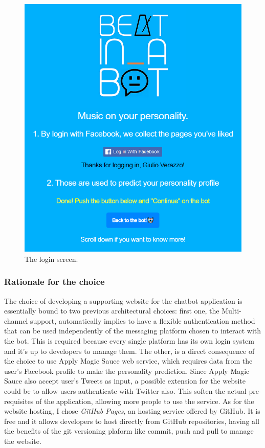 \documentclass[b5paper,10pt,twoside,cucitura]{toptesi}
\begin{document}
\begin{figure}[ht]
\centering
\includegraphics[scale=0.65]{website1.png}
\caption{The login screen.}
\end{figure}


\subsubsection{Rationale for the choice}
The choice of developing a supporting website for the chatbot application is essentially bound to two previous architectural choices: first one, the Multi-channel support, automatically implies to have a flexible authentication method that can be used independently of the messaging platform chosen to interact with the bot. This is required because every single platform has its own login system and it's up to developers to manage them. The other, is a direct consequence of the choice to use Apply Magic Sauce web service, which requires data from the user's Facebook profile to make the personality prediction. Since Apply Magic Sauce also accept user's Tweets as input, a possible extension for the website could be to allow users authenticate with Twitter also. This soften the actual pre-requisites of the application, allowing more people to use the service. As for the website hosting, I chose \textit{GitHub Pages}, an hosting service offered by GitHub. It is free and it allows developers to host directly from GitHub repositories, having all the benefits of the git versioning plaform like commit, push and pull to manage the website. 
\end{document}

